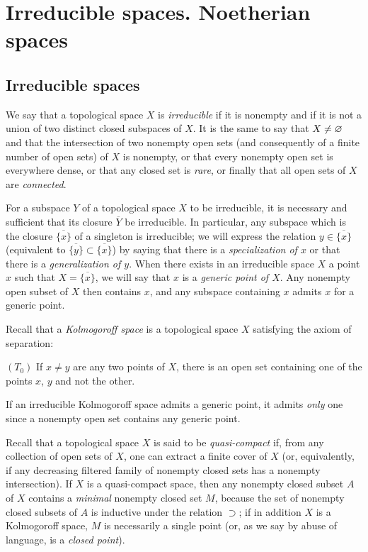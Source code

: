 \section{Irreducible spaces. Noetherian spaces}
\label{section-irreducible-and-noetherian-spaces}

\subsection{Irreducible spaces}
\label{subsection-irreducible-spaces}

\begin{env}[2.1.1]
\label{0.2.1.1}
We say that a topological space $X$ is {\em irreducible} if it is nonempty and
if it is not a union of two distinct closed subspaces of $X$. It is the same to
say that $X\neq\varnothing$ and that the intersection of two nonempty open sets (and
consequently of a finite number of open sets) of $X$ is nonempty, or that every
nonempty open set is everywhere dense, or that any closed set is {\em rare}, or
finally that all open sets of $X$ are {\em connected}.
\end{env}

\begin{env}[2.1.2]
\label{0.2.1.2}
For a subspace $Y$ of a topological space $X$ to be irreducible, it is necessary
and sufficient that its closure $\overline{Y}$ be irreducible. In particular,
any subspace which is the closure $\overline{\{x\}}$ of a singleton is
irreducible; we will express the relation $y\in\overline{\{x\}}$ (equivalent to
$\overline{\{y\}}\subset\overline{\{x\}}$) by saying that there is a
{\em specialization of $x$} or that there is a {\em generalization of $y$}.
When there exists in an irreducible space $X$ a point $x$ such that
$X=\overline{\{x\}}$, we will say that $x$ is a {\em generic point of $X$}. Any
nonempty open subset of $X$ then contains $x$, and any subspace containing $x$
admits $x$ for a generic point.
\end{env}

\begin{env}[2.1.3]
\label{0.2.1.3}
Recall that a {\em Kolmogoroff space} is a topological space $X$ satisfying the
axiom of separation:

$(T_0)$ If $x\neq y$ are any two points of $X$, there is an open set containing
one of the points $x$, $y$ and not the other.

If an irreducible Kolmogoroff space admits a generic point, it admits
{\em only} one since a nonempty open set contains any generic point.

Recall that a topological space $X$ is said to be {\em quasi-compact} if, from
any collection of open sets of $X$, one can extract a finite cover of $X$ (or,
equivalently, if any decreasing filtered family of nonempty closed sets has a
nonempty intersection). If $X$ is a quasi-compact space, then any nonempty
closed subset $A$ of $X$ contains a {\em minimal} nonempty closed set $M$,
because the set of nonempty closed subsets of $A$ is inductive under the
relation $\supset$; if in addition $X$ is a Kolmogoroff space, $M$ is
necessarily a single point (or, as we say by abuse of language, is a
{\em closed point}).
\end{env}

